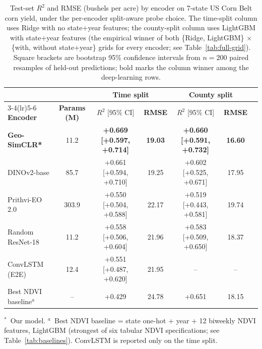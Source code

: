 \begin{table}[H]
\centering
\caption{Test-set $R^2$ and RMSE (bushels per acre) by encoder on 7-state US Corn Belt corn yield,
under the per-encoder split-aware probe choice. The time-split column uses Ridge with no state+year
features; the county-split column uses LightGBM with state+year features (the empirical winner of
both \{Ridge, LightGBM\} $\times$ \{with, without state+year\} grids for every encoder; see
Table~\ref{tab:full-grid}). Square brackets are bootstrap 95\% confidence intervals from $n\!=\!200$
paired resamples of held-out predictions; bold marks the column winner among the deep-learning rows.}
\label{tab:headline}
\begin{tabular}{lcccccc}
\toprule
& & \multicolumn{2}{c}{\textbf{Time split}} & \multicolumn{2}{c}{\textbf{County split}} \\
\cmidrule(lr){3-4}\cmidrule(lr){5-6}
\textbf{Encoder} & \textbf{Params (M)} & \textbf{$R^2$} [95\% CI] & \textbf{RMSE} & \textbf{$R^2$} [95\% CI] & \textbf{RMSE} \\
\midrule
\textbf{Geo-SimCLR*} & 11.2 & \textbf{+0.669 [+0.597, +0.714]} & \textbf{19.03} & \textbf{+0.660 [+0.591, +0.732]} & \textbf{16.60} \\
DINOv2-base & 85.7 & +0.661 [+0.594, +0.710] & 19.25 & +0.602 [+0.525, +0.671] & 17.95 \\
Prithvi-EO 2.0 & 303.9 & +0.550 [+0.504, +0.588] & 22.17 & +0.519 [+0.443, +0.581] & 19.74 \\
Random ResNet-18 & 11.2 & +0.558 [+0.506, +0.604] & 21.96 & +0.583 [+0.509, +0.650] & 18.37 \\
ConvLSTM (E2E) & 12.4 & +0.551 [+0.487, +0.620] & 21.95 & -- & -- \\
Best NDVI baseline$^{a}$ & -- & +0.429 & 24.78 & +0.651 & 18.15 \\
\bottomrule
\end{tabular}

\vspace{0.5em}
\footnotesize\raggedright
$^{*}$~Our model.\quad
$^{a}$~Best NDVI baseline = state one-hot + year + 12 biweekly NDVI features, LightGBM
(strongest of six tabular NDVI specifications; see Table~\ref{tab:baselines}).
ConvLSTM is reported only on the time split.
\end{table}
